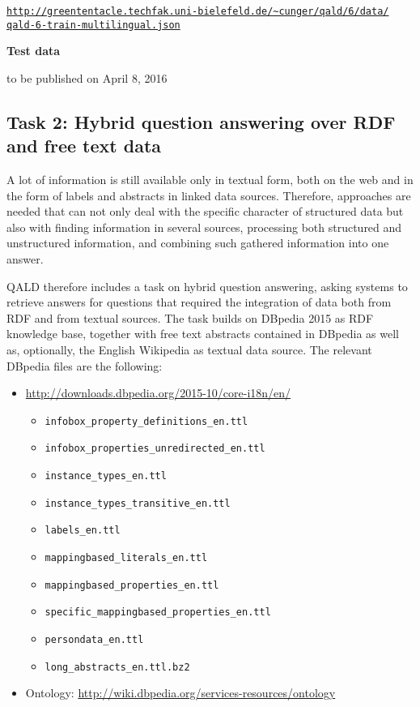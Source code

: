 \href{http://greententacle.techfak.uni-bielefeld.de/~cunger/qald/6/data/qald-6-train-multilingual.json}{\texttt{http://greententacle.techfak.uni-bielefeld.de/\textasciitilde cunger/qald/6/data/\\qald-6-train-multilingual.json}}

\textbf{Test data}

to be published on April 8, 2016


\subsection{Task 2: Hybrid question answering over RDF and free text data}

A lot of information is still available only in textual form, both on the web and in the form of labels and abstracts in linked data sources.
Therefore, approaches are needed that can not only deal with the specific character of structured data but also with finding information in several sources, processing both structured and unstructured information, and combining such gathered information into one answer.

QALD therefore includes a task on hybrid question answering, asking systems to retrieve answers for questions that required the integration of data both from RDF and from textual sources.
The task builds on DBpedia 2015 as RDF knowledge base, together with free text abstracts contained in DBpedia as well as, optionally, the English Wikipedia as textual data source.
The relevant DBpedia files are the following:
\begin{itemize}
\item \url{http://downloads.dbpedia.org/2015-10/core-i18n/en/}
  \begin{itemize}
  \item \texttt{infobox\_property\_definitions\_en.ttl}
  \item \texttt{infobox\_properties\_unredirected\_en.ttl}
  \item \texttt{instance\_types\_en.ttl}
  \item \texttt{instance\_types\_transitive\_en.ttl}
  \item \texttt{labels\_en.ttl}
  \item \texttt{mappingbased\_literals\_en.ttl}
  \item \texttt{mappingbased\_properties\_en.ttl}
  \item \texttt{specific\_mappingbased\_properties\_en.ttl}
  \item \texttt{persondata\_en.ttl}
  \item \texttt{long\_abstracts\_en.ttl.bz2}
\end{itemize}
\item Ontology: \url{http://wiki.dbpedia.org/services-resources/ontology}
\end{itemize}

